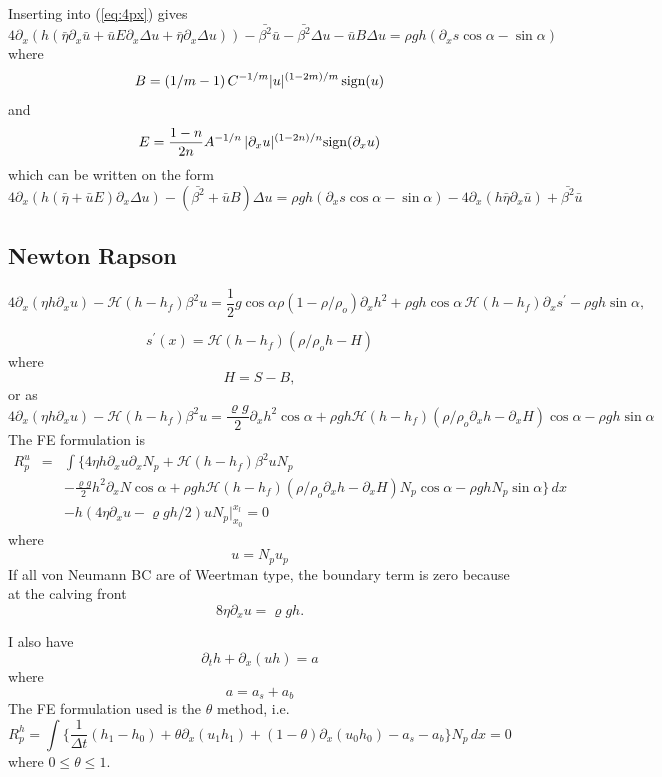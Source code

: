 \documentclass[10pt,a4paper]{book}
\newcommand{\He}{\mathcal{H}}
\newcommand{\p}{\partial}
\begin{document}
Inserting into (\ref{eq:4px}) gives
\[
4 \p_x (h (\bar{\eta} \p_x \bar{u} + \bar{u} E \p_x \Delta u + \bar{\eta} \p_x \Delta u))
-\bar{\beta^2} \bar{u} - \bar{\beta^2} \Delta u - \bar{u} B \Delta u 
 = \rho g h (\p_x s \cos \alpha  -  \sin \alpha )
\]
where
\[
B=(1/m-1) \, C^{-1/m}  |u|^{(1-2m)/m}\, \hbox{sign}(u)
\]
and
\[
E=\frac{1-n}{2n} A^{-1/n} \, |\p_x u|^{(1-2n)/n}  \hbox{sign}(\p_x u)
\]
which can be written on the form
\[
4 \p_x ( h (\bar{\eta}+ \bar{u} E   ) \p_x \Delta u )
-(\bar{\beta^2} + \bar{u} B) \Delta u 
 = \rho g h (\p_x s \cos \alpha  -  \sin \alpha ) - 4 \p_x (h \bar{\eta} \p_x \bar{u}) +\bar{\beta^2} \bar{u} 
\]


\subsection{Newton Rapson}


\begin{equation}
4 \p_x ( \eta h \p_x u) -\He(h-h_f) \beta^2 u = \frac{1}{2} g \cos \alpha \rho (1-\rho/\rho_o)\p_x
h^2 + \rho g h \cos \alpha \, \He(h-h_f) \p_x s^{'} -  \rho g h \sin \alpha ,
\label{eq:fouree}
\end{equation}

\[
 s^{'}(x) =\He(h-h_f) (\rho/\rho_o h - H) 
\]
where
\[
H=S-B,
\]
or as
\begin{equation}
4 \p_x ( \eta h \p_x u) - \He(h-h_f) \beta^2 u = \frac{\varrho g}{2} \p_x  h^2 \cos \alpha + \rho g h \He(h-h_f)
(\rho/\rho_o \p_x h - \p_x H) \cos \alpha - \rho g h \sin \alpha
\label{eq:foure}
\end{equation}
The FE formulation is
\begin{eqnarray}
R^u_p&=&\int \{ 4 \eta h \p_x u \p_x N_p + \He(h-h_f) \beta^2 u  N_p   \nonumber \\
& & - \frac{\varrho g}{2}   h^2 \p_x N \cos \alpha
+ \rho g  h
\He(h-h_f) (\rho/\rho_o \p_x h - \p_x H) N_p \cos \alpha -\rho g h  N_p \sin \alpha \} \, dx \nonumber \\
& & - h (4 \eta \p_x u -\varrho g h/2)  u N_p |_{x_0}^{x_l}=0
\end{eqnarray}
where
\[
u=N_p u_p
\]
If all von Neumann BC are of Weertman type, the boundary term is zero because at the calving front
\[
8 \eta \p_x u = \varrho g h .
\]

I also have
\begin{equation}
\p_t h + \p_x (u h) =a
\label{eq:pthp}
\end{equation}
where
\[
a=a_s+a_b
\]
The FE formulation used is the $\theta$ method, i.e.\
\begin{equation}
R_p^h= \int \{ \frac{1}{\Delta t} ( h_1 - h_0) 
+ \theta \p_x (u_1 h_1 ) +  (1-\theta) \p_x (u_0 h_0) 
-a_s -a_b \} N_p \, dx =0
\label{eq:rph}
\end{equation}
where $0\le \theta \le 1$.
\end{document}
